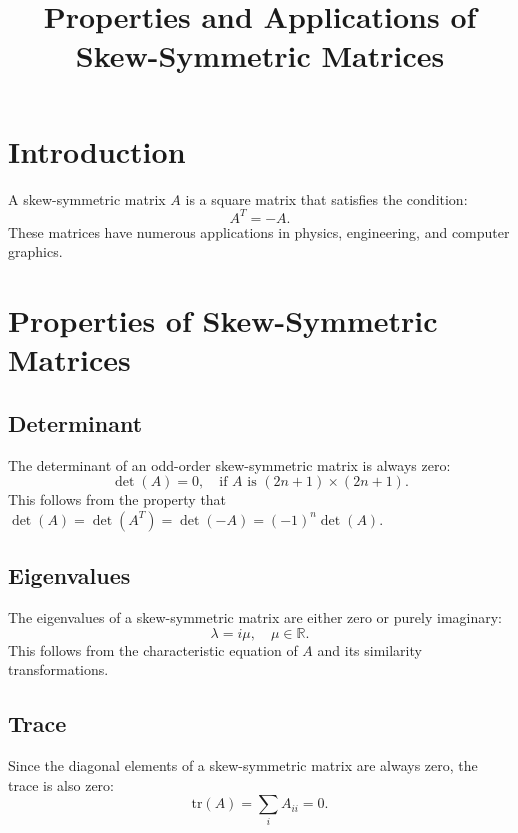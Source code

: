 \documentclass[a4paper,12pt]{article}
\title{Properties and Applications of Skew-Symmetric Matrices}
\author{}
\date{}
\begin{document}
	
	\maketitle
	
	\tableofcontents
	
	\section{Introduction}
	A skew-symmetric matrix $A$ is a square matrix that satisfies the condition:
	\begin{equation}
		A^T = -A.
	\end{equation}
	These matrices have numerous applications in physics, engineering, and computer graphics.
	
	\section{Properties of Skew-Symmetric Matrices}
	
	\subsection{Determinant}
	The determinant of an odd-order skew-symmetric matrix is always zero:
	\begin{equation}
		\det(A) = 0, \quad \text{if } A \text{ is } (2n+1) \times (2n+1).
	\end{equation}
	This follows from the property that $\det(A) = \det(A^T) = \det(-A) = (-1)^n \det(A)$. 
	
	\subsection{Eigenvalues}
	The eigenvalues of a skew-symmetric matrix are either zero or purely imaginary:
	\begin{equation}
		\lambda = i \mu, \quad \mu \in \mathbb{R}.
	\end{equation}
	This follows from the characteristic equation of $A$ and its similarity transformations.
	
	\subsection{Trace}
	Since the diagonal elements of a skew-symmetric matrix are always zero, the trace is also zero:
	\begin{equation}
		\text{tr}(A) = \sum_{i} A_{ii} = 0.
	\end{equation}
	
\end{document}
